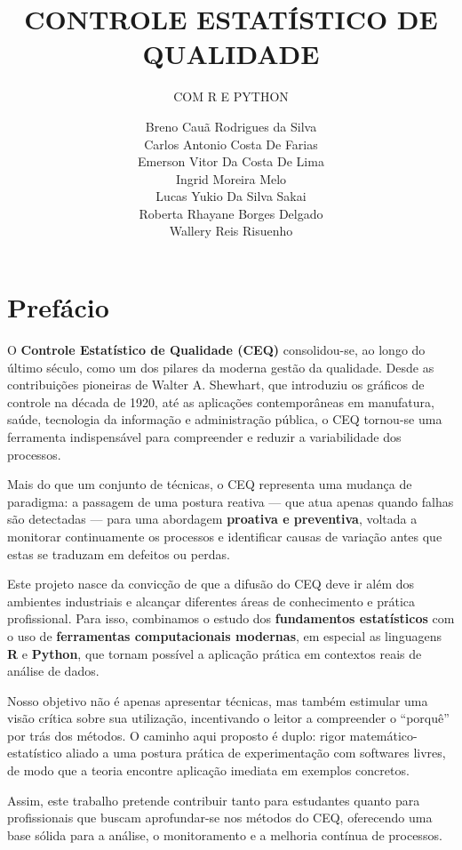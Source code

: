 \documentclass[
  portuguese,
  11pt,
  a4paper,
  DIV=11,
  numbers=noendperiod]{scrreprt}
\title{CONTROLE ESTATÍSTICO DE QUALIDADE}
\subtitle{COM R E PYTHON}
\author{Breno Cauã Rodrigues da Silva \\ Carlos Antonio Costa De
Farias \\ Emerson Vitor Da Costa De Lima \\ Ingrid Moreira
Melo \\ Lucas Yukio Da Silva Sakai \\ Roberta Rhayane Borges
Delgado \\ Wallery Reis Risuenho}
\date{}
\renewcommand*\contentsname{Índice}
\newcommand\contentsname{Índice}
\begin{document}
\maketitle

\renewcommand*\contentsname{Índice}
{
\hypersetup{linkcolor=}
\setcounter{tocdepth}{2}
\tableofcontents
}


\chapter*{Prefácio}\label{prefuxe1cio}


O \textbf{Controle Estatístico de Qualidade (CEQ)} consolidou-se, ao
longo do último século, como um dos pilares da moderna gestão da
qualidade. Desde as contribuições pioneiras de Walter A. Shewhart, que
introduziu os gráficos de controle na década de 1920, até as aplicações
contemporâneas em manufatura, saúde, tecnologia da informação e
administração pública, o CEQ tornou-se uma ferramenta indispensável para
compreender e reduzir a variabilidade dos processos.

Mais do que um conjunto de técnicas, o CEQ representa uma mudança de
paradigma: a passagem de uma postura reativa --- que atua apenas quando
falhas são detectadas --- para uma abordagem \textbf{proativa e
preventiva}, voltada a monitorar continuamente os processos e
identificar causas de variação antes que estas se traduzam em defeitos
ou perdas.

Este projeto nasce da convicção de que a difusão do CEQ deve ir além dos
ambientes industriais e alcançar diferentes áreas de conhecimento e
prática profissional. Para isso, combinamos o estudo dos
\textbf{fundamentos estatísticos} com o uso de \textbf{ferramentas
computacionais modernas}, em especial as linguagens \textbf{R} e
\textbf{Python}, que tornam possível a aplicação prática em contextos
reais de análise de dados.

Nosso objetivo não é apenas apresentar técnicas, mas também estimular
uma visão crítica sobre sua utilização, incentivando o leitor a
compreender o ``porquê'' por trás dos métodos. O caminho aqui proposto é
duplo: rigor matemático-estatístico aliado a uma postura prática de
experimentação com softwares livres, de modo que a teoria encontre
aplicação imediata em exemplos concretos.

Assim, este trabalho pretende contribuir tanto para estudantes quanto
para profissionais que buscam aprofundar-se nos métodos do CEQ,
oferecendo uma base sólida para a análise, o monitoramento e a melhoria
contínua de processos.
\end{document}
